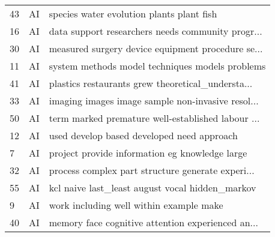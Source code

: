 \begin{tabular}{lll}
43                                                 &                                                 AI &          species water evolution plants plant fish \\
16                                                 &                                                 AI &  data support researchers needs community progr... \\
30                                                 &                                                 AI &  measured surgery device equipment procedure se... \\
11                                                 &                                                 AI &    system methods model techniques models problems \\
41                                                 &                                                 AI &  plastics restaurants grew theoretical\_understa... \\
33                                                 &                                                 AI &  imaging images image sample non-invasive resol... \\
50                                                 &                                                 AI &  term marked premature well-established labour ... \\
12                                                 &                                                 AI &         used develop based developed need approach \\
7                                                  &                                                 AI &     project provide information eg knowledge large \\
32                                                 &                                                 AI &  process complex part structure generate experi... \\
55                                                 &                                                 AI &    kcl naive last\_least august vocal hidden\_markov \\
9                                                  &                                                 AI &            work including well within example make \\
40                                                 &                                                 AI &  memory face cognitive attention experienced an... \\

\end{tabular}
